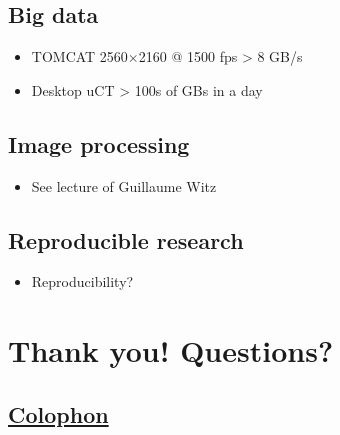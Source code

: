 \documentclass[handout,aspectratio=169,10pt]{beamer}
\begin{document}
\hypertarget{big-data}{\subsection{Big data}\label{big-data}}

\begin{frame}

\begin{itemize}
	\item TOMCAT 2560\(\times\)2160 @ 1500 fps \textgreater{} 8 GB/s
	\item Desktop uCT \textgreater{} 100s of GBs in a day
\end{itemize}
\end{frame}

\hypertarget{image-processing-1}{\subsection{Image processing}\label{image-processing-1}}

\begin{frame}

\begin{itemize}
	\item See lecture of Guillaume Witz
\end{itemize}
\end{frame}

\hypertarget{reproducible-research}{\subsection{Reproducible research}\label{reproducible-research}}
\begin{frame}

\begin{itemize}
	\item  Reproducibility?
\end{itemize}
\end{frame}


\hypertarget{thank-you-questions}{\section{Thank you! Questions?}\label{thank-you-questions}}

\hypertarget{colophon}{\subsection{\texorpdfstring{\href{https://en.wikipedia.org/wiki/Colophon_(publishing)}{Colophon}}{Colophon}}\label{colophon}}
\end{document}
